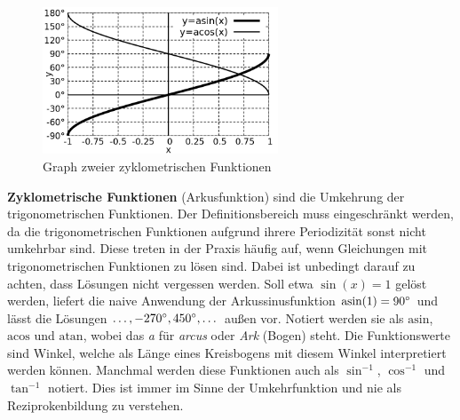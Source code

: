 \begin{minipage}[t]{1\textwidth}
    \begin{figure}
        \centering
        \includegraphics[width=7cm]{./gnuplot/base-function-arc}
        \caption{Graph zweier zyklometrischen Funktionen}
        \label{fig:ExBaseFunArc}
    \end{figure}
    \textbf{Zyklometrische Funktionen} (Arkusfunktion) sind die Umkehrung der trigonometrischen Funktionen. Der Definitionsbereich muss eingeschränkt werden, da die trigonometrischen Funktionen aufgrund ihrere Periodizität sonst nicht umkehrbar sind. Diese treten in der Praxis häufig auf, wenn Gleichungen mit trigonometrischen Funktionen zu lösen sind. Dabei ist unbedingt darauf zu achten, dass Lösungen nicht vergessen werden. Soll etwa $\sin(x)=1$ gelöst werden, liefert die naive Anwendung der Arkussinusfunktion $\text{asin}(1) = \SI{90}{\degree}$ und lässt die Lösungen $\dots, \SI{-270}{\degree}, \SI{450}{\degree}, \dots$ außen vor. Notiert werden sie als $\text{asin}$, $\text{acos}$ und $\text{atan}$, wobei das \emph{a} für \emph{arcus} oder \emph{Ark} (Bogen) steht. Die Funktionswerte sind Winkel, welche als Länge eines Kreisbogens mit diesem Winkel interpretiert werden können. Manchmal werden diese Funktionen auch als $\sin^{-1}$, $\cos^{-1}$ und $\tan^{-1}$ notiert. Dies ist immer im Sinne der Umkehrfunktion und nie als Reziprokenbildung zu verstehen.
\end{minipage}

